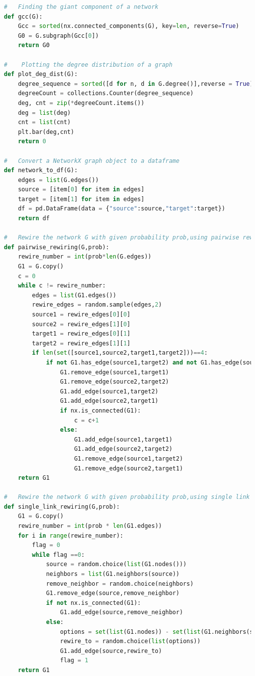 \documentclass[12pt]{article}
\begin{document}
{\begin{lstlisting}[language=Python,breaklines=true]
#   Finding the giant component of a network
def gcc(G):
    Gcc = sorted(nx.connected_components(G), key=len, reverse=True)
    G0 = G.subgraph(Gcc[0])
    return G0

#    Plotting the degree distribution of a graph
def plot_deg_dist(G):
    degree_sequence = sorted([d for n, d in G.degree()],reverse = True)
    degreeCount = collections.Counter(degree_sequence)
    deg, cnt = zip(*degreeCount.items())
    deg = list(deg)
    cnt = list(cnt)
    plt.bar(deg,cnt)
    return 0

#   Convert a NetworkX graph object to a dataframe
def network_to_df(G):
    edges = list(G.edges())
    source = [item[0] for item in edges]
    target = [item[1] for item in edges]
    df = pd.DataFrame(data = {"source":source,"target":target})
    return df

#   Rewire the network G with given probability prob,using pairwise rewiring
def pairwise_rewiring(G,prob):
    rewire_number = int(prob*len(G.edges))
    G1 = G.copy()
    c = 0 
    while c != rewire_number:
        edges = list(G1.edges())
        rewire_edges = random.sample(edges,2)
        source1 = rewire_edges[0][0]
        source2 = rewire_edges[1][0]
        target1 = rewire_edges[0][1]
        target2 = rewire_edges[1][1]
        if len(set([source1,source2,target1,target2]))==4:
            if not G1.has_edge(source1,target2) and not G1.has_edge(source2,target1):
                G1.remove_edge(source1,target1)
                G1.remove_edge(source2,target2)
                G1.add_edge(source1,target2)
                G1.add_edge(source2,target1)
                if nx.is_connected(G1):
                    c = c+1
                else:
                    G1.add_edge(source1,target1)
                    G1.add_edge(source2,target2)
                    G1.remove_edge(source1,target2)
                    G1.remove_edge(source2,target1)
    return G1

#   Rewire the network G with given probability prob,using single link rewiring
def single_link_rewiring(G,prob):
    G1 = G.copy()
    rewire_number = int(prob * len(G1.edges))
    for i in range(rewire_number):
        flag = 0
        while flag ==0:
            source = random.choice(list(G1.nodes()))
            neighbors = list(G1.neighbors(source))
            remove_neighbor = random.choice(neighbors)
            G1.remove_edge(source,remove_neighbor)
            if not nx.is_connected(G1):
                G1.add_edge(source,remove_neighbor)
            else:
                options = set(list(G1.nodes)) - set(list(G1.neighbors(source)))-set([source,remove_neighbor])
                rewire_to = random.choice(list(options))
                G1.add_edge(source,rewire_to)
                flag = 1
    return G1


\end{lstlisting}}
\end{document}

